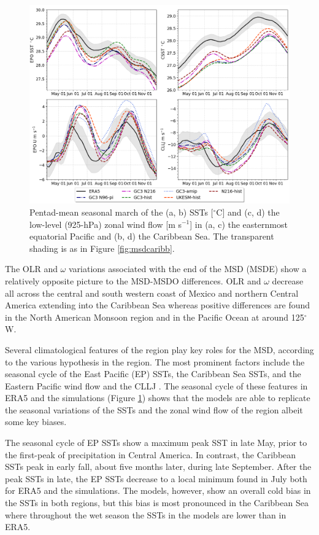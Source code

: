  \begin{figure}[t!]
\includegraphics[width=\linewidth]{figures/index_seasonal}
\caption[Seasonal cycle of East Pacific and Caribbean SSTs and zonal winds.]{Pentad-mean seasonal march of the (a, b) SSTs [$^\circ$C] and (c, d) the low-level (925-hPa) zonal wind flow [m s$^{-1}$] in (a, c) the easternmost equatorial Pacific and (b, d) the Caribbean Sea. The transparent shading is as in Figure \ref{fig:msdcaribb}.}
\label{fig:csst}
\end{figure}
 
 
 The OLR and $\omega$ variations associated with the end of the MSD (MSDE) show a relatively opposite picture to the MSD-MSDO differences. OLR and $\omega$ decrease all across the central and south western coast of Mexico and northern Central America extending into the Caribbean Sea whereas positive differences are found in the North American Monsoon region and in the Pacific Ocean at around 125$^\circ$W.  

Several climatological features of the region play key roles for the MSD, according to the various hypothesis in the region. The most prominent factors include the seasonal cycle of the East Pacific (EP) SSTs, the Caribbean Sea SSTs, and the Eastern Pacific wind flow and the CLLJ \citep{magana1999,amador2008,herrera2015,straffon2019,garcia2020sub}. 
The seasonal cycle of these features in ERA5 and the simulations (Figure \ref{fig:csst}) shows that the models are able to replicate the seasonal variations of the SSTs and the zonal wind flow of the region albeit some key biases. 

The seasonal cycle of EP SSTs show a maximum peak SST in late May, prior to the first-peak of precipitation in Central America. In contrast, the Caribbean SSTs peak in early fall, about five months later, during late September. After the peak SSTs in late, the EP SSTs decrease to a local minimum found in July both for ERA5 and the simulations. The models, however, show an overall cold bias in the SSTs in both regions, but this bias is most pronounced in the Caribbean Sea where throughout the wet season the SSTs in the models are lower than in ERA5. 

